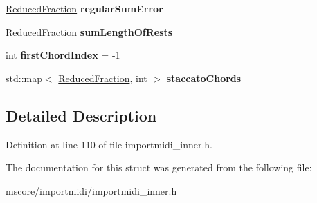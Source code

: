 \begin{DoxyCompactItemize}
\item 
\mbox{\label{struct_ms_1_1_midi_tuplet_1_1_tuplet_info_a9bf5a47fd3da661e1e128e773b4bc610}} 
\hyperlink{class_ms_1_1_reduced_fraction}{Reduced\+Fraction} {\bfseries regular\+Sum\+Error}
\item 
\mbox{\label{struct_ms_1_1_midi_tuplet_1_1_tuplet_info_ae3119ead7306535c99d39886a2ba1b87}} 
\hyperlink{class_ms_1_1_reduced_fraction}{Reduced\+Fraction} {\bfseries sum\+Length\+Of\+Rests}
\item 
\mbox{\label{struct_ms_1_1_midi_tuplet_1_1_tuplet_info_a370bd8141d958cea4f3049b8fbe781b8}} 
int {\bfseries first\+Chord\+Index} = -\/1
\item 
\mbox{\label{struct_ms_1_1_midi_tuplet_1_1_tuplet_info_aec7c0b52d897b982533b701478d995d2}} 
std\+::map$<$ \hyperlink{class_ms_1_1_reduced_fraction}{Reduced\+Fraction}, int $>$ {\bfseries staccato\+Chords}
\end{DoxyCompactItemize}


\subsection{Detailed Description}


Definition at line 110 of file importmidi\+\_\+inner.\+h.



The documentation for this struct was generated from the following file\+:\begin{DoxyCompactItemize}
\item 
mscore/importmidi/importmidi\+\_\+inner.\+h\end{DoxyCompactItemize}
